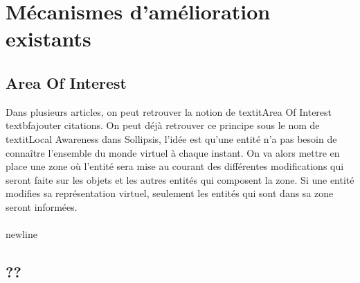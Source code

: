 \section{Mécanismes d'amélioration existants}
	\subsection{Area Of Interest}
	Dans plusieurs articles, on peut retrouver la notion de textit{Area Of Interest} textbf{ajouter citations}. On peut déjà retrouver ce principe sous le nom de textit{Local Awareness} dans Sollipsis, l'idée est qu'une entité n'a pas besoin de connaître l'ensemble du monde virtuel à chaque instant. On va alors mettre en place une zone où l'entité sera mise au courant des différentes modifications qui seront faite sur les objets et les autres entités qui composent la zone. Si une entité modifies sa représentation virtuel, seulement les entités qui sont dans sa zone seront informées.\\
	\\newline
	\subsection{??}
